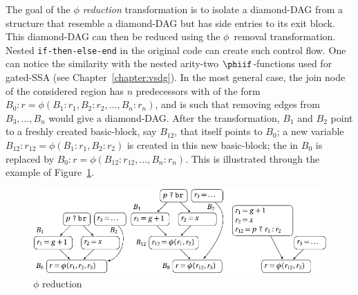 The goal of the \emph{$\phi$ reduction} transformation is to isolate a diamond-DAG from a structure that resemble a diamond-DAG but has side entries to its exit block. This diamond-DAG can then be reduced using the $\phi$~removal transformation. Nested \texttt{if-then-else-end} in the original code can create such control flow. One can notice the similarity with the nested arity-two $\phiif$-functions used for gated-SSA (see Chapter~\ref{chapter:vsdg}). In the most general case, the join node of the considered region has $n$ predecessors with \phifuns of the form $B_0:r=\phi(B_1:r_1,B_2:r_2,\dots,B_n:r_n)$, and is such that removing edges from $B_3,\dots, B_n$ would give a diamond-DAG. After the transformation, $B_1$ and $B_2$ point to a freshly created basic-block, say $B_{12}$, that itself points to $B_0$; a new variable $B_{12}:r_{12}=\phi(B_1:r_1,B_2:r_2)$ is created in this new basic-block; the \phifun in $B_0$ is replaced by $B_0:r=\phi(B_{12}:r_{12},\dots,B_n:r_n)$. This is illustrated through the example of Figure~\ref{fig:phi_red}.
\begin{figure}[h]
  \includegraphics[scale=0.9]{phi_reduction}
  \caption{\label{fig:phi_red}$\phi$ reduction}
\end{figure}

